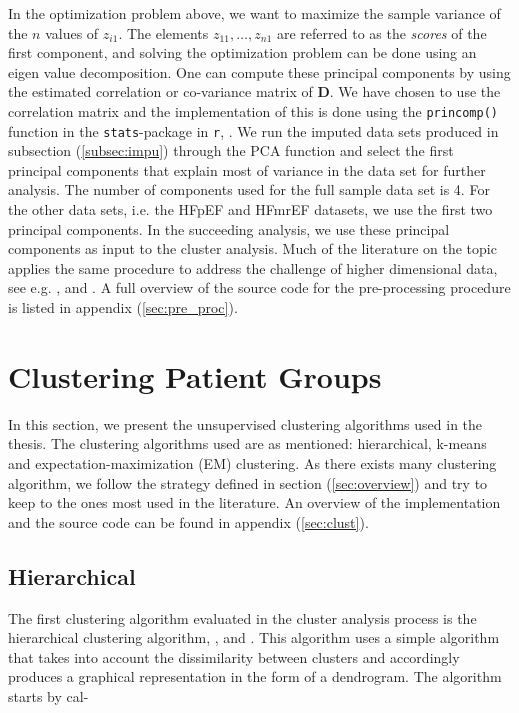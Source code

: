 \documentclass[../thesis.tex]{subfiles}
\begin{document}
\noindent In the optimization problem above, we want to maximize the sample variance of the $n$ values of $z_{i1}$. The elements $z_{11}, \hdots ,z_{n1}$ are referred to as the \textit{scores} of the first component, and solving the optimization problem can be done using an eigen value decomposition. One can compute these principal components by using the estimated correlation or co-variance matrix of $\mathbf{D}$. We have chosen to use the correlation matrix and the implementation of this is done using the \texttt{princomp()} function in the \texttt{stats}-package in \texttt{r}, \citep{stats}. We run the imputed data sets produced in subsection (\ref{subsec:impu}) through the PCA function and select the first principal components that explain most of variance in the data set for further analysis. The number of components used for the full sample data set is 4. For the other data sets, i.e. the HFpEF and HFmrEF datasets, we use the first two principal components. In the succeeding analysis, we use these principal components as input to the cluster analysis. Much of the literature on the topic applies the same procedure to address the challenge of higher dimensional data, see e.g. \cite{shah2014phenomapping}, \cite{ahmad2014clinical} and \cite{katz2017phenomapping}. A full overview of the source code for the pre-processing procedure is listed in appendix (\ref{sec:pre_proc}).

\section{Clustering Patient Groups}
\label{sec:cluster_pat_gro}

\noindent In this section, we present the unsupervised clustering algorithms used in the thesis. The clustering algorithms used are as mentioned: hierarchical, k-means and expectation-maximization (EM) clustering. As there exists many clustering algorithm, we follow the strategy defined in section (\ref{sec:overview}) and try to keep to the ones most used in the literature. An overview of the implementation and the source code can be found in appendix (\ref{sec:clust}).

\vspace*{-0,25cm}\subsection{Hierarchical}
\label{subsec:hierarchical}

\noindent The first clustering algorithm evaluated in the cluster analysis process is the hierarchical clustering algorithm, \cite{sibson1973slink}, \cite{defays1977efficient} and \citep{rohlf198212}. This algorithm uses a simple algorithm that takes into account the dissimilarity between clusters and accordingly produces a graphical representation in the form of a dendrogram. The algorithm starts by cal-\\
\end{document}
